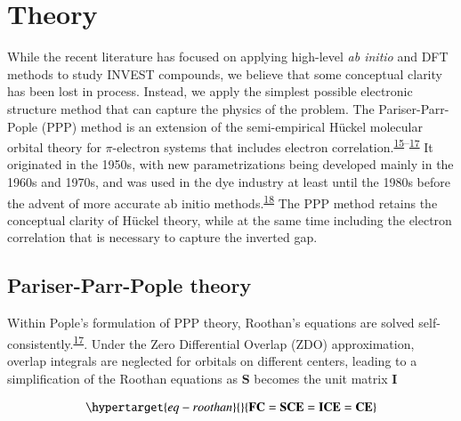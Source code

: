 \documentclass[
  number,
  3p]{elsarticle}
\begin{document}
\hypertarget{theory}{%
\section{Theory}\label{theory}}

While the recent literature has focused on applying high-level \emph{ab
initio} and DFT methods to study INVEST compounds, we believe that some
conceptual clarity has been lost in process. Instead, we apply the
simplest possible electronic structure method that can capture the
physics of the problem. The Pariser-Parr-Pople (PPP) method is an
extension of the semi-empirical Hückel molecular orbital theory for
\(\pi\)-electron systems that includes electron
correlation.\textsuperscript{\protect\hyperlink{ref-pariserSemiEmpiricalTheory1953a}{15}--\protect\hyperlink{ref-popleElectronInteractionUnsaturated1953}{17}}
It originated in the 1950s, with new parametrizations being developed
mainly in the 1960s and 1970s, and was used in the dye industry at least
until the 1980s before the advent of more accurate ab initio
methods.\textsuperscript{\protect\hyperlink{ref-griffithsPracticalAspectsColour1982}{18}}
The PPP method retains the conceptual clarity of Hückel theory, while at
the same time including the electron correlation that is necessary to
capture the inverted gap.

\hypertarget{pariser-parr-pople-theory}{%
\subsection{Pariser-Parr-Pople theory}\label{pariser-parr-pople-theory}}

Within Pople's formulation of PPP theory, Roothan's equations are solved
self-consistently.\textsuperscript{\protect\hyperlink{ref-popleElectronInteractionUnsaturated1953}{17}}.
Under the Zero Differential Overlap (ZDO) approximation, overlap
integrals are neglected for orbitals on different centers, leading to a
simplification of the Roothan equations as \(\mathbf{S}\) becomes the
unit matrix \(\mathbf{I}\)

\begin{equation}\protect\hypertarget{eq-roothan}{}{
\mathbf{FC} = \mathbf{SCE} = \mathbf{ICE} = \mathbf{CE}
}\label{eq-roothan}\end{equation}
\end{document}
